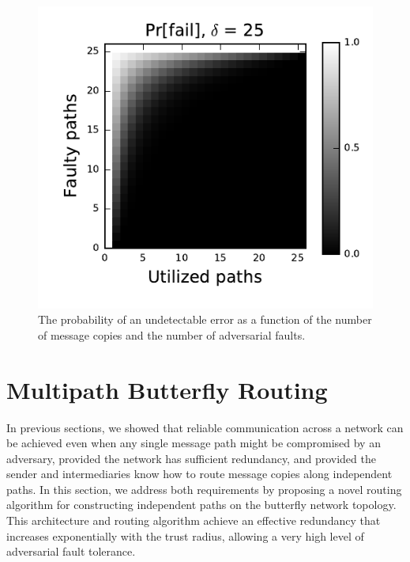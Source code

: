 \documentclass{sig-alternate-05-2015}
\begin{document}
\begin{figure}
\centerline{\includegraphics{fig-perror}}
\caption{
The probability of an undetectable error as a function of the number of
message copies and the number of adversarial faults.
}
\label{fig:pfail}
\end{figure}

\section{Multipath Butterfly Routing}
\label{sec-butterfly}

In previous sections, we showed that reliable communication across a network
can be achieved even when any single message path might be compromised by
an adversary,
provided the network has sufficient redundancy,
and provided the sender and intermediaries know how to route message
copies along independent paths.
In this section, we address both requirements by proposing a novel routing
algorithm for constructing independent paths on the butterfly network topology.
This architecture and routing algorithm achieve an
effective redundancy that increases exponentially with the trust radius,
allowing a very high level of adversarial fault tolerance.
\end{document}
